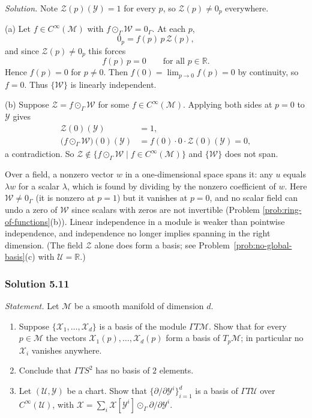 \documentclass[11pt]{article}
\newcommand{\TpM}{T_p\mathcal M}
\newcommand{\Cinf}{C^\infty(\mathcal M)}
\begin{document}
\medskip
\noindent\textit{Solution.} Note $\mathcal Z(p)(\mathcal Y)=1$ for every
$p$, so $\mathcal Z(p)\neq0_p$ everywhere.

(a) Let $f\in\Cinf$ with $f\odot_\Gamma\mathcal W=0_\Gamma$. At each $p$,
\[
0_p=f(p)\,p\,\mathcal Z(p),
\]
and since $\mathcal Z(p)\neq0_p$ this forces
\[
f(p)\,p=0\qquad\text{for all }p\in\mathbb R.
\]
Hence $f(p)=0$ for $p\neq0$. Then $f(0)=\lim_{p\to0}f(p)=0$ by continuity,
so $f=0$. Thus $\{\mathcal W\}$ is linearly independent.

(b) Suppose $\mathcal Z=f\odot_\Gamma\mathcal W$ for some $f\in\Cinf$.
Applying both sides at $p=0$ to $\mathcal Y$ gives
\begin{align*}
\mathcal Z(0)(\mathcal Y) &= 1,\\
\big(f\odot_\Gamma\mathcal W\big)(0)(\mathcal Y) &= f(0)\cdot0\cdot\mathcal Z(0)(\mathcal Y)=0,
\end{align*}
a contradiction. So $\mathcal Z\notin\{f\odot_\Gamma\mathcal W\mid
f\in\Cinf\}$ and $\{\mathcal W\}$ does not span.

Over a field, a nonzero vector $w$ in a one-dimensional space spans it:
any $u$ equals $\lambda w$ for a scalar $\lambda$, which is found by
dividing by the nonzero coefficient of $w$. Here $\mathcal W\neq0_\Gamma$ (it is
nonzero at $p=1$) but it vanishes at $p=0$, and no scalar field can undo a
zero of $\mathcal W$ since scalars with zeros are not invertible (Problem
\ref{prob:ring-of-functions}(b)). Linear independence in a module is
weaker than pointwise independence, and independence no longer implies
spanning in the right dimension. (The field $\mathcal Z$ alone does form a
basis; see Problem~\ref{prob:no-global-basis}(c) with $\mathcal U=\mathbb R$.)

\subsubsection*{Solution 5.11}

\noindent\textit{Statement.} Let $\mathcal M$ be a smooth manifold of
dimension $d$.
\begin{enumerate}[label=(\alph*)]
  \item Suppose $\{\mathcal X_1,\dots,\mathcal X_d\}$ is a basis of the
  module $\Gamma T\mathcal M$. Show that for every $p\in\mathcal M$ the
  vectors $\mathcal X_1(p),\dots,\mathcal X_d(p)$ form a basis of $\TpM$; in
  particular no $\mathcal X_i$ vanishes anywhere.
  \item Conclude that $\Gamma TS^2$ has no basis of $2$ elements.
  \item Let $(\mathcal U,\mathcal Y)$ be a chart. Show that
  $\{\partial/\partial\mathcal Y^i\}_{i=1}^d$ is a basis of $\Gamma
  T\mathcal U$ over $C^\infty(\mathcal U)$, with $\mathcal X=\sum_i\mathcal
  X[\mathcal Y^i]\odot_\Gamma\partial/\partial\mathcal Y^i$.
\end{enumerate}
\end{document}
